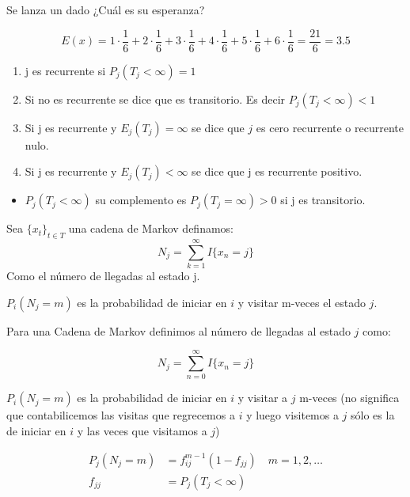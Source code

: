 \begin{example}{}{}
    Se lanza un dado ¿Cuál es su esperanza?
\end{example}

\[
E(x) = 1 \cdot \frac{1}{6} + 2 \cdot \frac{1}{6} + 3 \cdot \frac{1}{6} + 4 \cdot \frac{1}{6} + 5 \cdot \frac{1}{6} + 6 \cdot \frac{1}{6} = \frac{21}{6} = 3.5
\]

\begin{defi}{}{}
    \begin{enumerate}
        \item j es recurrente si $P_{j}(T_{j} < \infty) = 1$
        \item Si no es recurrente se dice que es transitorio. Es decir $P_{j}(T_{j} < \infty) < 1$
        \item Si j es recurrente y $E_{j} (T_{j}) = \infty$ se dice que $j$ es cero recurrente o recurrente nulo.
        \item Si j es recurrente y $E_{j}(T_{j}) < \infty$ se dice que j es recurrente positivo.
    \end{enumerate}
    \begin{itemize}
        \item $P_{j}(T_{j} < \infty)$ su complemento es 
        $P_{j}(T_{j} = \infty) > 0$ si j es transitorio.
    \end{itemize}
\end{defi}

\begin{defi}{}{}
    Sea $\{x_{t}\}_{t \in T}$  una cadena de Markov definamos:
    \[
        N_{j} = \sum_{k=1}^{\infty} I\{x_{n} = j\}
    \]
    Como el número de llegadas al estado j.

    $P_{i}(N_{j} = m)$ es la probabilidad de iniciar en $i$ y visitar m-veces el estado $j$.
\end{defi}


\begin{defi}{}{}
    Para una Cadena de Markov definimos al número de llegadas al estado $j$ como:

    \[
    N_{j} = \sum_{n=0}^{\infty} I\{x_{n} = j\}
    \]
\end{defi}

$P_{i}(N_{j} = m)$ es la probabilidad de iniciar en $i$ y visitar a $j$ m-veces (no significa que contabilicemos las visitas que regrecemos a $i$ y luego visitemos a $j$ sólo es la de iniciar en $i$ y las veces que visitamos a $j$)

\begin{align*}
    P_{j}(N_{j} = m) & = f_{ij}^{m-1} (1 - f_{jj})  \quad m = 1,2,\dots\\
    f_{jj} & = P_{j} (T_{j} < \infty) 
\end{align*}

